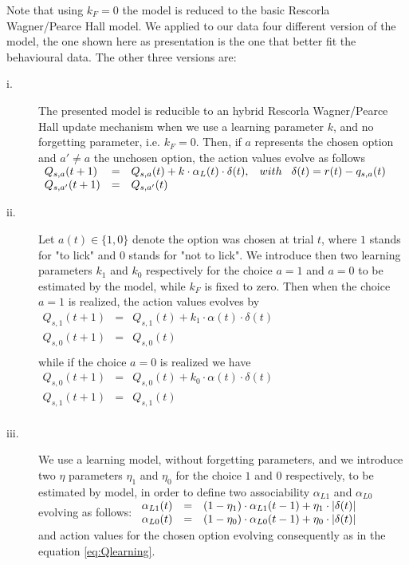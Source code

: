 Note that using $k_F = 0$ the model is reduced to the basic Rescorla Wagner/Pearce Hall model. We applied to our data four different version of the model, the one shown here as presentation is the one that better fit the behavioural data. The other three versions are:
\begin{description}
    \item[i.] The presented model is reducible to an hybrid Rescorla Wagner/Pearce Hall update mechanism when we use a learning parameter $k$, and no forgetting parameter, i.e. $k_F = 0$.
    Then, if $a$ represents the chosen option and $a'\neq a$ the unchosen option, the action values evolve as follows\\
    $\begin{array}{lcl}
    Q_{s,a}(t+1)&=& Q_{s,a}(t)+k\cdot\alpha_L(t)\cdot\delta(t), \hspace{0.3cm} with \hspace{0.3cm}\delta(t)=r(t)-q_{s,a}(t)\\
    Q_{s,a'}(t+1)&=&Q_{s,a'}(t)\\
    \end{array}$
    \item[ii.] Let $a(t) \in \{1,0\}$ denote the option was chosen at trial $t$, where $1$ stands for "to lick" and $0$ stands for "not to lick". We introduce then two learning parameters $k_{1}$ and $k_{0}$ respectively for the choice $a=1$ and $a=0$ to be estimated by the model, while $k_F$ is fixed to zero.
    Then when the choice $a=1$ is realized, the action values evolves by\\
   $\begin{array}{lcl}
       Q_{s,1}(t+1)&=&Q_{s,1}(t)+k_1\cdot\alpha(t)\cdot\delta(t)\\
         Q_{s,0}(t+1)&=&Q_{s,0}(t)\\ 
    \end{array}$\\
    while if the choice $a=0$ is realized we have\\
    $\begin{array}{lcl}
       Q_{s,0}(t+1)&=&Q_{s,0}(t)+k_0\cdot\alpha(t)\cdot\delta(t)\\
         Q_{s,1}(t+1)&=&Q_{s,1}(t)\\ 
    \end{array}$
    \item[iii.] We use a learning model, without forgetting parameters, and we introduce two $\eta$ parameters $\eta_1$ and $\eta_0$ for the choice $1$ and $0$ respectively, to be estimated by model, in order to define two associability $\alpha_{L1}$ and $\alpha_{L0}$ evolving as follows:
   $\begin{array}{lcl}
    \alpha_{L1}(t) & = & (1-\eta_1)\cdot\alpha_{L1}(t-1)+\eta_1\cdot\left\lvert\delta(t)\right\rvert \\
    \alpha_{L0}(t) & = & (1-\eta_0)\cdot\alpha_{L0}(t-1)+\eta_0\cdot\left\lvert\delta(t)\right\rvert \\
    \end{array}$\\
    and action values for the chosen option evolving consequently as in the equation \ref{eq:Qlearning}.
\end{description}
